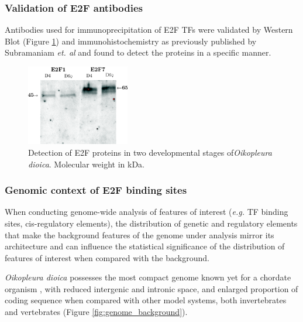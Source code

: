 \documentclass[11pt,twoside,a4paper]{report}
\begin{document}
		\subsubsection{Validation of E2F antibodies}
		Antibodies used for immunoprecipitation of E2F TFs were validated by Western Blot (Figure \ref{fig:E2F_westerns}) and immunohistochemistry as previously published by Subramaniam \textit{et. al} \cite{Subramaniam2014} and found to detect the proteins in a specific manner.
		
		\begin{figure}[here]
			\setlength{\belowcaptionskip}{5pt}
			\centering
			\includegraphics[width=0.4\textwidth]{pngs/E2Fs_western.png}
			\caption[Detection of E2F proteins in two developmental stages of\textit{Oikopleura}]
			{Detection of E2F proteins in two developmental stages of\textit{Oikopleura dioica}.
				{\footnotesize 
					Molecular weight in kDa.
				}
			}
			\label{fig:E2F_westerns}
		\end{figure}
	
		\subsubsection{Genomic context of E2F binding sites}
		When conducting genome-wide analysis of features of interest (\textit{e.g.} TF binding sites, cis-regulatory elements), the distribution of genetic and regulatory elements that make the background features of the genome under analysis mirror its architecture and can influence the statistical significance of the distribution of features of interest when compared with the background.
		
		\textit{Oikopleura dioica} possesses the most compact genome known yet for a chordate organism \cite{Denoeud2010}, with reduced intergenic and intronic space, and enlarged proportion of coding sequence when compared with other model systems, both invertebrates and vertebrates (Figure \ref{fig:genome_background}).
	
\end{document}
